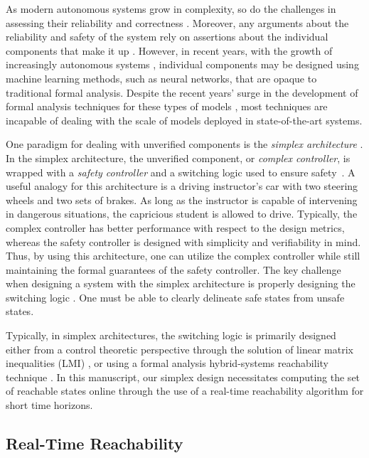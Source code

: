 \documentclass[manuscript,screen,review]{acmart}
\begin{document}
As modern autonomous systems grow in complexity, so do the challenges in assessing their reliability and correctness \cite{Bak2009Simplex}. Moreover, any arguments about the reliability and safety of the system rely on assertions about the individual components that make it up \cite{Bak2014}. However, in recent years, with the growth of increasingly autonomous systems \cite{Jha2020}, individual components may be designed using machine learning methods, such as neural networks, that are opaque to traditional formal analysis. Despite the recent years' surge in the development of formal analysis techniques for these types of models \cite{Liu2019,xiang20118survey}, most techniques are incapable of dealing with the scale of models deployed in state-of-the-art systems.

One paradigm for dealing with unverified components is the \emph{simplex architecture} \cite{RiveraAnArchitectural1996}. In the simplex architecture, the unverified component, or \emph{complex controller}, is wrapped with a \emph{safety controller} and a switching logic used to ensure safety~\cite{Bak2014}. A useful analogy for this architecture is a driving instructor's car with two steering wheels and two sets of brakes. As long as the instructor is capable of intervening in dangerous situations, the capricious student is allowed to drive. Typically, the complex controller has better performance with respect to the design metrics, whereas the safety controller is designed with simplicity and verifiability in mind. Thus, by using this architecture, one can utilize the complex controller while still maintaining the formal guarantees of the safety controller. The key challenge when designing a system with the simplex architecture is properly designing the switching logic \cite{Johnson2016}. One must be able to clearly delineate safe states from unsafe states. 

Typically, in simplex architectures, the switching logic is primarily designed either from a control theoretic perspective through the solution of linear matrix inequalities (LMI) \cite{SetoCaseStudy2000}, or using a formal analysis hybrid-systems reachability technique \cite{Bak2009Simplex}. In this manuscript, our simplex design necessitates computing the set of reachable states online through the use of a real-time reachability algorithm for short time horizons.

\subsection{Real-Time Reachability}
\end{document}

